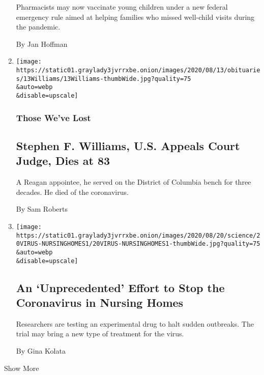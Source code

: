 \begin{enumerate}
  Pharmacists may now vaccinate young children under a new federal
  emergency rule aimed at helping families who missed well-child visits
  during the pandemic.

  By Jan Hoffman
\item
  \href{/2020/08/20/obituaries/stephen-f-williams-dead-coronavirus.html}{}

  \texttt{[image: https://static01.graylady3jvrrxbe.onion/images/2020/08/13/obituaries/13Williams/13Williams-thumbWide.jpg?quality=75\\\&auto=webp\\\&disable=upscale]}

  \hypertarget{those-weve-lost}{%
  \subsubsection{Those We've Lost}\label{those-weve-lost}}

  \hypertarget{stephen-f-williams-us-appeals-court-judge-dies-at-83}{%
  \subsection{Stephen F. Williams, U.S. Appeals Court Judge, Dies at
  83}\label{stephen-f-williams-us-appeals-court-judge-dies-at-83}}

  A Reagan appointee, he served on the District of Columbia bench for
  three decades. He died of the coronavirus.

  By Sam Roberts
\item
  \href{/2020/08/20/health/coronavirus-nursing-homes.html}{}

  \texttt{[image: https://static01.graylady3jvrrxbe.onion/images/2020/08/20/science/20VIRUS-NURSINGHOMES1/20VIRUS-NURSINGHOMES1-thumbWide.jpg?quality=75\\\&auto=webp\\\&disable=upscale]}

  \hypertarget{an-unprecedented-effort-to-stop-the-coronavirus-in-nursing-homes}{%
  \subsection{An `Unprecedented' Effort to Stop the Coronavirus in
  Nursing
  Homes}\label{an-unprecedented-effort-to-stop-the-coronavirus-in-nursing-homes}}

  Researchers are testing an experimental drug to halt sudden outbreaks.
  The trial may bring a new type of treatment for the virus.

  By Gina Kolata
\end{enumerate}

Show More

